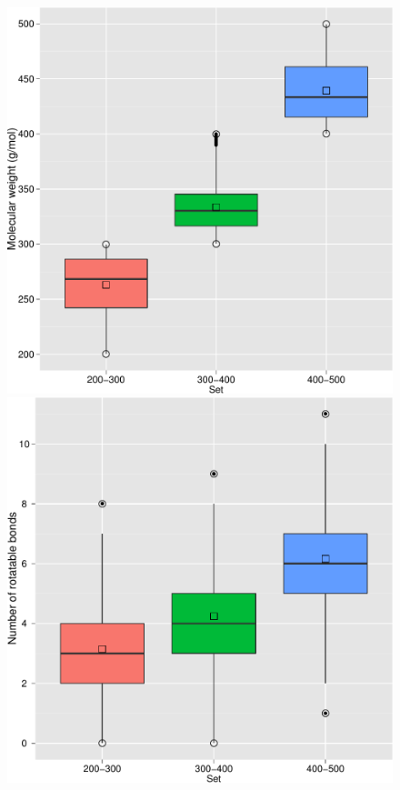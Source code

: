 \documentclass[12pt]{article}
\begin{document}
\begin{center}
\begin{figure}
\subfloat
{
  \includegraphics[width=0.485\linewidth]{MWT3.pdf}
}
\subfloat
{
  \includegraphics[width=0.485\linewidth]{NRB3.pdf}
}
\end{figure}
\end{center}

\clearpage
\end{document}
